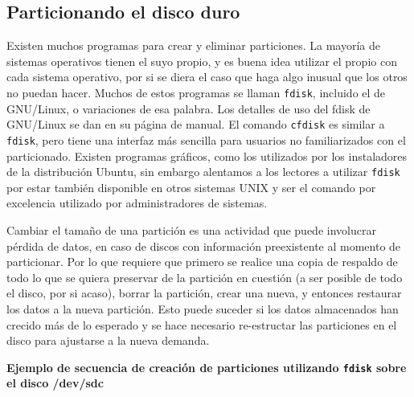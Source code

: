 \documentclass[12pt]{article}
\begin{document}
\subsection*{Particionando el disco duro}

Existen muchos programas para crear y eliminar particiones. La mayoría de 
sistemas operativos tienen el suyo propio, y es buena idea utilizar el 
propio con cada sistema operativo, por si se diera el caso que haga algo 
inusual que los otros no puedan hacer. Muchos de estos programas se 
llaman \texttt{fdisk}, incluido el de GNU/Linux, o variaciones de esa 
palabra. Los detalles de uso del fdisk de GNU/Linux se dan en su página 
de manual. El comando \texttt{cfdisk} es similar a \texttt{fdisk}, pero tiene 
una interfaz más sencilla para usuarios no familiarizados con el 
particionado. Existen programas gráficos, como los utilizados por los 
instaladores de la distribución Ubuntu, sin embargo alentamos a los 
lectores a utilizar \texttt{fdisk} por estar también disponible en 
otros sistemas UNIX y ser el comando por excelencia utilizado por 
administradores de sistemas. 

Cambiar el tamaño de una partición es una actividad que puede involucrar
pérdida de datos, en caso de discos con información preexistente al 
momento de particionar. Por lo que requiere que primero se realice una 
copia de respaldo de todo lo que se quiera preservar de la partición en 
cuestión (a ser posible de todo el disco, por si acaso), borrar la 
partición, crear una nueva, y entonces restaurar los datos a la nueva 
partición. Esto puede suceder si los datos almacenados han crecido más de 
lo esperado y se hace necesario re-estructar las particiones en el disco 
para ajustarse a la nueva demanda. 


{\bf Ejemplo de secuencia de creación de particiones utilizando
\texttt{fdisk} sobre el disco /dev/sdc}
\end{document}
